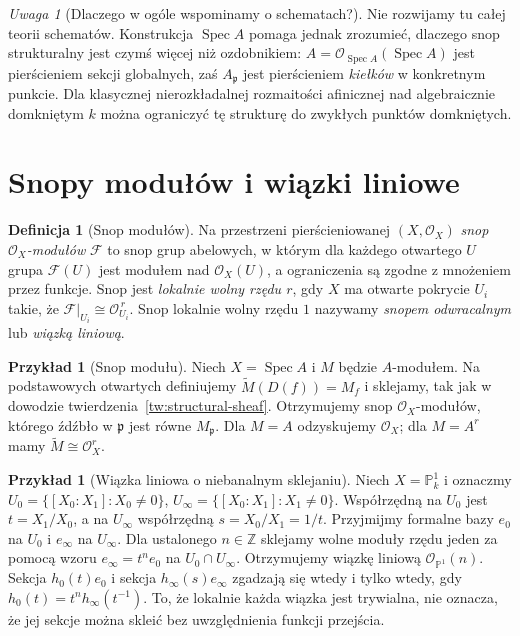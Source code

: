 \documentclass[11pt,a4paper,openany]{report}
\numberwithin{equation}{section}
\theoremstyle{plain}
\theoremstyle{definition}
\newtheorem{definicja}[twierdzenie]{Definicja}
\newtheorem{przyklad}[twierdzenie]{Przykład}
\theoremstyle{remark}
\newtheorem{uwaga}[twierdzenie]{Uwaga}
\newcommand{\Z}{\mathbb Z}
\newcommand{\PP}{\mathbb P}
\newcommand{\Spec}{\operatorname{Spec}}
\begin{document}
\begin{uwaga}[Dlaczego w ogóle wspominamy o schematach?]
Nie rozwijamy tu całej teorii schematów. Konstrukcja
$\Spec A$ pomaga jednak zrozumieć, dlaczego snop
strukturalny jest czymś więcej niż ozdobnikiem:
$A=\mathcal O_{\Spec A}(\Spec A)$ jest pierścieniem
sekcji globalnych, zaś $A_{\mathfrak p}$ jest
pierścieniem \emph{kiełków} w konkretnym punkcie.
Dla klasycznej nierozkładalnej rozmaitości afinicznej
nad algebraicznie domkniętym $k$ można ograniczyć
tę strukturę do zwykłych punktów domkniętych.
\end{uwaga}

\section{Snopy modułów i wiązki liniowe}
\label{sec:wiazki}

\begin{definicja}[Snop modułów]
Na przestrzeni pierścieniowanej $(X,\mathcal O_X)$
\emph{snop $\mathcal O_X$-modułów} $\mathcal F$
to snop grup abelowych, w którym dla każdego
otwartego $U$ grupa $\mathcal F(U)$ jest modułem
nad $\mathcal O_X(U)$, a ograniczenia są zgodne
z mnożeniem przez funkcje. Snop jest \emph{lokalnie
wolny rzędu $r$}, gdy $X$ ma otwarte pokrycie
$U_i$ takie, że
$\mathcal F|_{U_i}\cong\mathcal O_{U_i}^{\,r}$.
Snop lokalnie wolny rzędu $1$ nazywamy
\emph{snopem odwracalnym} lub \emph{wiązką liniową}.
\end{definicja}

\begin{przyklad}[Snop modułu]
Niech $X=\Spec A$ i $M$ będzie $A$-modułem.
Na podstawowych otwartych definiujemy
$\widetilde M(D(f))=M_f$ i sklejamy, tak jak w
dowodzie twierdzenia~\ref{tw:structural-sheaf}.
Otrzymujemy snop $\mathcal O_X$-modułów, którego
źdźbło w $\mathfrak p$ jest równe $M_{\mathfrak p}$.
Dla $M=A$ odzyskujemy $\mathcal O_X$; dla
$M=A^r$ mamy $\widetilde M\cong\mathcal O_X^r$.
\end{przyklad}

\begin{przyklad}[Wiązka liniowa o niebanalnym sklejaniu]
Niech $X=\PP^1_k$ i oznaczmy
$U_0=\{[X_0:X_1]:X_0\ne0\}$,
$U_\infty=\{[X_0:X_1]:X_1\ne0\}$.
Współrzędną na $U_0$ jest $t=X_1/X_0$,
a na $U_\infty$ współrzędną $s=X_0/X_1=1/t$.
Przyjmijmy formalne bazy $e_0$ na $U_0$
i $e_\infty$ na $U_\infty$. Dla ustalonego
$n\in\Z$ sklejamy wolne moduły rzędu jeden
za pomocą wzoru $e_\infty=t^n e_0$
na $U_0\cap U_\infty$. Otrzymujemy wiązkę
liniową $\mathcal O_{\PP^1}(n)$.
Sekcja $h_0(t)e_0$ i sekcja $h_\infty(s)e_\infty$
zgadzają się wtedy i tylko wtedy, gdy
$h_0(t)=t^n h_\infty(t^{-1})$.
To, że lokalnie każda wiązka jest trywialna,
nie oznacza, że jej sekcje można skleić bez
uwzględnienia funkcji przejścia.
\end{przyklad}
\end{document}
